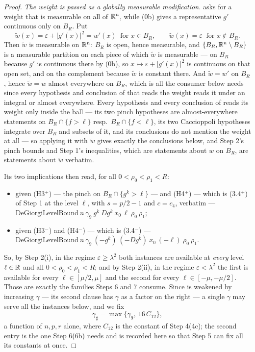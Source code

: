 \begin{proof}
\emph{The weight is passed as a globally measurable modification.}
 asks for a weight that is measurable on
all of $\mathbb{R}^n$, while (0b) gives a representative $g'$ continuous only on $B_R$.
Put
\[
\widetilde w(x)=\varepsilon+|g'(x)|^2=w'(x)\ \text{ for }x\in B_R,
\qquad
\widetilde w(x)=\varepsilon\ \text{ for }x\notin B_R .
\]
Then $\widetilde w$ is measurable on $\mathbb{R}^n$: $B_R$ is open, hence measurable,
and $\{B_R,\mathbb{R}^n\setminus B_R\}$ is a measurable partition on each piece of which
$\widetilde w$ is measurable --- on $B_R$ because $g'$ is continuous there by
(0b), so $x\mapsto\varepsilon+|g'(x)|^2$ is continuous on that open set,
and on the complement because $\widetilde w$ is constant there.  And
$\widetilde w=w'$ on $B_R$, hence $\widetilde w=w$ almost everywhere on $B_R$,
which is all the consumer below needs since every hypothesis and conclusion of
 that reads the weight reads it under an
integral or almost everywhere.  Every hypothesis and every conclusion of
 reads its weight only inside the ball ---
its two pinch hypotheses are almost-everywhere statements on
$B_R\cap\{f>\ell\}$ resp.\ $B_R\cap\{f<\ell\}$, its two Caccioppoli hypotheses
integrate over $B_R$ and subsets of it, and its conclusions do not mention the
weight at all --- so applying it with $\widetilde w$ gives exactly the
conclusions below, and Step 2's pinch bounds and Step 1's inequalities, which
are statements about $w$ on $B_R$, are statements about $\widetilde w$ verbatim.

Its two implications then read, for all $0<\rho_0<\rho_1<R$:
\begin{itemize}
\item given (H3$^+$) --- the pinch on $B_R\cap\{g^k>\ell\}$ --- and (H4$^+$) ---
  which is (3.4$^+$) of Step 1 at the level $\ell$, with $s=p/2-1$ and $c=c_4$,
  verbatim ---
  $\mathrm{DeGiorgiLevelBound}\ n\ \gamma_9\ g^k\ Dg^k\ x_0\ \ell\ \rho_0\ \rho_1$;
\item given (H3$^-$) and (H4$^-$) --- which is (3.4$^-$) ---
  $\mathrm{DeGiorgiLevelBound}\ n\ \gamma_9\ (-g^k)\ (-Dg^k)\ x_0\ (-\ell)\
  \rho_0\ \rho_1$.
\end{itemize}
So, by Step 2(i), in the regime $\varepsilon\ge\lambda^2$ both instances are
available at \emph{every} level $\ell\in\mathbb{R}$ and all $0<\rho_0<\rho_1<R$; and by
Step 2(ii), in the regime $\varepsilon<\lambda^2$ the first is available for
every $\ell\in[\mu/2,\mu]$ and the second for every $\ell\in[-\mu,-\mu/2]$.
Those are exactly the families Steps 6 and 7 consume.  Since
 is weakened by increasing $\gamma$ --- its second
clause has $\gamma$ as a factor on the right --- a single $\gamma$ may serve all
the instances below, and we fix
\[
\gamma_\sharp=\max\bigl\{\gamma_9,\ 16\,C_{12}\bigr\} ,
\]
a function of $n,p,r$ alone, where $C_{12}$ is the constant of Step 4(4c); the
second entry is the one Step 6(6b) needs and is recorded here so that Step 5
can fix all its constants at once.


\end{proof}
